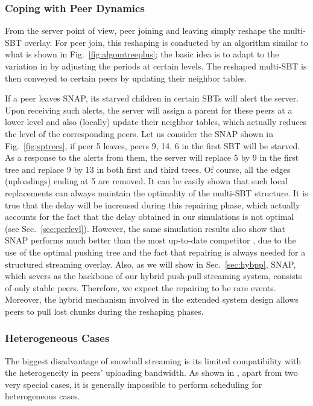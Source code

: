 \documentclass[conference]{IEEEtran}
\begin{document}
\subsubsection{Coping with Peer Dynamics} \label{sec:peerdy}
  From the server point of view, peer joining and leaving simply reshape the multi-SBT overlay. For peer join, this reshaping is conducted by an algorithm similar to what is shown in Fig.~\ref{fig:algomtreeplus}; the basic idea is to adapt to the variation in  by adjusting the periods at certain levels. The reshaped multi-SBT is then conveyed to certain peers by updating their neighbor tables.

  If a peer leaves SNAP, its starved children in certain SBTs will alert the server. Upon receiving such alerts, the server will assign a parent for these peers at a lower level and also (locally) update their neighbor tables, which actually reduces the level of the corresponding peers. Let us consider the SNAP shown in Fig.~\ref{fig:sptrees}, if peer 5 leaves, peers 9, 14, 6 in the first SBT will be starved. As a response to the alerts from them, the server will replace 5 by 9 in the first tree and replace 9 by 13 in both first and third trees. Of course, all the edges (uploadings) ending at 5 are removed. It can be easily shown that such local replacements can always maintain the optimality of the multi-SBT structure. It is true that the delay will be increased during this repairing phase, which actually accounts for the fact that the delay obtained in our simulations is not optimal (see Sec.~\ref{sec:perfevl}). However, the same simulation results also show that SNAP performs much better than the most up-to-date competitor \cite{WangLX-INFOCOM08}, due to the use of the optimal pushing tree and the fact that repairing is always needed for a structured streaming overlay. Also, as we will show in Sec.~\ref{sec:hybpp}, SNAP, which severs as the backbone of our hybrid push-pull streaming system, consists of only stable peers. Therefore, we expect the repairing to be rare events. Moreover, the hybrid mechanism involved in the extended system design allows peers to pull lost chunks during the reshaping phases.

\subsubsection{Heterogeneous Cases} \label{sec:hetero}
  The biggest disadvantage of snowball streaming is its limited compatibility with the heterogeneity in peers' uploading bandwidth. As shown in \cite{Liu-MM07}, apart from two very special cases, it is generally impossible to perform scheduling for heterogeneous cases.
\end{document}
